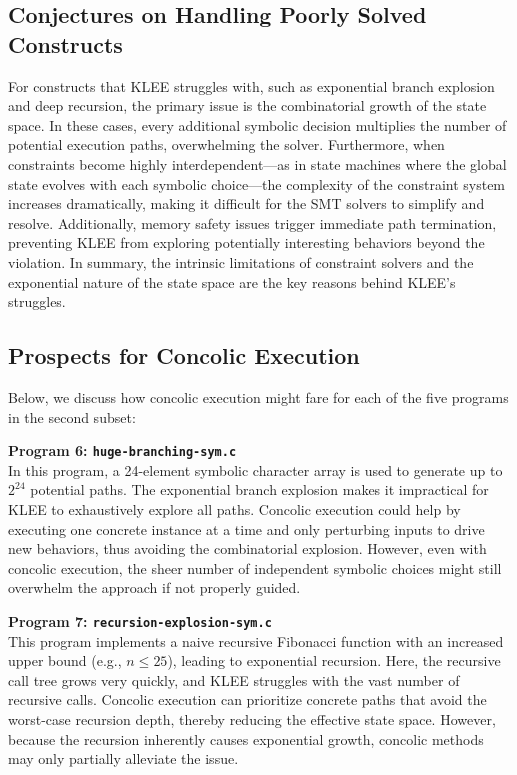 \documentclass[conference]{IEEEtran}
\begin{document}
\subsection{Conjectures on Handling Poorly Solved Constructs}
For constructs that KLEE struggles with, such as exponential branch explosion and deep recursion, the primary issue is the combinatorial growth of the state space. In these cases, every additional symbolic decision multiplies the number of potential execution paths, overwhelming the solver. Furthermore, when constraints become highly interdependent—as in state machines where the global state evolves with each symbolic choice—the complexity of the constraint system increases dramatically, making it difficult for the SMT solvers to simplify and resolve. Additionally, memory safety issues trigger immediate path termination, preventing KLEE from exploring potentially interesting behaviors beyond the violation. In summary, the intrinsic limitations of constraint solvers and the exponential nature of the state space are the key reasons behind KLEE’s struggles.

\subsection{Prospects for Concolic Execution}
Below, we discuss how concolic execution might fare for each of the five programs in the second subset:

\textbf{Program 6: \texttt{huge-branching-sym.c}}\\
In this program, a 24-element symbolic character array is used to generate up to $2^{24}$ potential paths. The exponential branch explosion makes it impractical for KLEE to exhaustively explore all paths. Concolic execution could help by executing one concrete instance at a time and only perturbing inputs to drive new behaviors, thus avoiding the combinatorial explosion. However, even with concolic execution, the sheer number of independent symbolic choices might still overwhelm the approach if not properly guided.


\textbf{Program 7: \texttt{recursion-explosion-sym.c}}\\
This program implements a naive recursive Fibonacci function with an increased upper bound (e.g., $n \leq 25$), leading to exponential recursion. Here, the recursive call tree grows very quickly, and KLEE struggles with the vast number of recursive calls. Concolic execution can prioritize concrete paths that avoid the worst-case recursion depth, thereby reducing the effective state space. However, because the recursion inherently causes exponential growth, concolic methods may only partially alleviate the issue.
\end{document}
